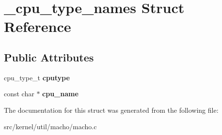 \hypertarget{struct__cpu__type__names}{}\section{\+\_\+cpu\+\_\+type\+\_\+names Struct Reference}
\label{struct__cpu__type__names}
\subsection*{Public Attributes}
\begin{DoxyCompactItemize}
\item 
\mbox{\label{struct__cpu__type__names_a3d4085d6bbb4b91576103ce322171969}} 
cpu\+\_\+type\+\_\+t {\bfseries cputype}
\item 
\mbox{\label{struct__cpu__type__names_a4c8e16a1056ec96386ed2dda33d9ef11}} 
const char $\ast$ {\bfseries cpu\+\_\+name}
\end{DoxyCompactItemize}


The documentation for this struct was generated from the following file\+:\begin{DoxyCompactItemize}
\item 
src/kernel/util/macho/macho.\+c\end{DoxyCompactItemize}
